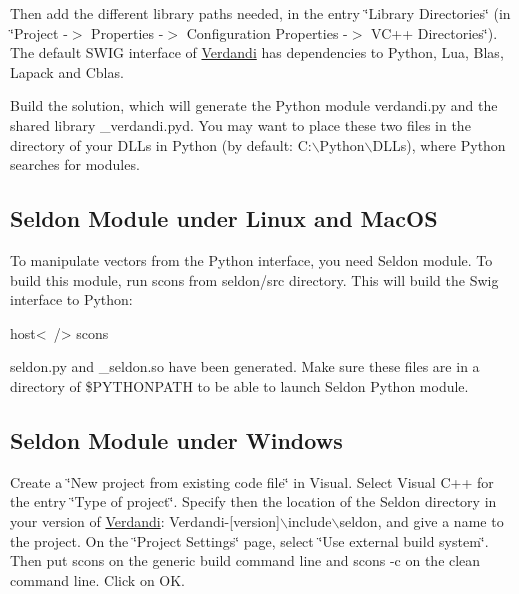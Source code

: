 \documentclass{tufte-book}
\begin{document}
\-Then add the different library paths needed, in the entry \char`\"{}\-Library Directories\char`\"{} (in \char`\"{}\-Project -\/$>$ Properties -\/$>$ Configuration Properties -\/$>$ V\-C++ Directories\char`\"{}). \-The default \-S\-W\-I\-G interface of \hyperlink{namespace_verdandi}{\-Verdandi} has dependencies to \-Python, \-Lua, \-Blas, \-Lapack and \-Cblas.

\-Build the solution, which will generate the \-Python module {\ttfamily verdandi.\-py} and the shared library {\ttfamily \-\_\-verdandi.\-pyd}. \-You may want to place these two files in the directory of your {\ttfamily \-D\-L\-Ls} in \-Python (by default\-: {\ttfamily \-C\-:$\backslash$\-Python$\backslash$\-D\-L\-Ls}), where \-Python searches for modules.\hypertarget{python_seldon}{}\subsection{\-Seldon Module under Linux and Mac\-O\-S}\label{python_seldon}
\-To manipulate vectors from the \-Python interface, you need \-Seldon module. \-To build this module, run {\ttfamily scons} from {\ttfamily seldon/src} directory. \-This will build the {\ttfamily \-Swig} interface to \-Python\-:

\begin{frame_bash}
host<~/> scons
\end{frame_bash}


{\ttfamily seldon.\-py} and {\ttfamily \-\_\-seldon.\-so} have been generated. \-Make sure these files are in a directory of {\ttfamily \$\-P\-Y\-T\-H\-O\-N\-P\-A\-T\-H} to be able to launch {\ttfamily \-Seldon} \-Python module.\hypertarget{python_seldon2}{}\subsection{\-Seldon Module under Windows}\label{python_seldon2}
\-Create a \char`\"{}\-New project from existing code file\char`\"{} in \-Visual. \-Select \-Visual \-C++ for the entry \char`\"{}\-Type of project\char`\"{}. \-Specify then the location of the \-Seldon directory in your version of \hyperlink{namespace_verdandi}{\-Verdandi}\-: {\ttfamily \-Verdandi-\/\mbox{[}version\mbox{]}$\backslash$include$\backslash$seldon}, and give a name to the project. \-On the \char`\"{}\-Project Settings\char`\"{} page, select \char`\"{}\-Use external build system\char`\"{}. \-Then put {\ttfamily scons} on the generic build command line and {\ttfamily scons -\/c} on the clean command line. \-Click on \-O\-K.
\end{document}
